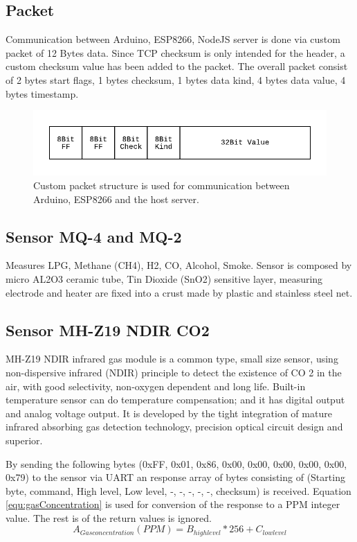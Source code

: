 \subsection{Packet}
Communication between Arduino, ESP8266, NodeJS server is done via custom packet of 12 Bytes data.
Since TCP checksum is only intended for the header, a custom checksum value has been added to the packet.
The overall packet consist of 2 bytes start flags, 1 bytes checksum, 1 bytes data kind, 4 bytes data value, 4 bytes timestamp.

\begin{figure}[p]
    \centering
    \includegraphics[width=\linewidth]{packet1}
    \caption{Custom packet structure is used for communication between Arduino, ESP8266 and the host server.}
    \label{fig:packet1}
\end{figure}


\subsection{Sensor MQ-4 and MQ-2}
Measures LPG, Methane (CH4), H2, CO, Alcohol, Smoke.
Sensor is composed by micro AL2O3 ceramic tube, Tin Dioxide (SnO2) sensitive layer,
measuring electrode and heater are fixed into a crust made by plastic and stainless steel net.


\subsection{Sensor MH-Z19 NDIR CO2}
MH-Z19 NDIR infrared gas module is a common type, small size sensor, using non-dispersive
infrared (NDIR) principle to detect the existence of CO 2 in the air, with good selectivity, non-oxygen
dependent and long life. Built-in temperature sensor can do temperature compensation; and it has
digital output and analog voltage output. It is developed by the tight integration of mature infrared absorbing
gas detection technology, precision optical circuit design and superior.

By sending the following bytes (0xFF, 0x01, 0x86, 0x00, 0x00, 0x00, 0x00, 0x00, 0x79) to the sensor via UART an response array of bytes consisting of
(Starting byte, command, High level, Low level, -, -, -, -, -, checksum) is received. Equation \ref{equ:gasConcentration} is used for conversion of the response to a PPM integer value.
The rest is of the return values is ignored.
\begin{equation}
  A_{Gas concentration} (PPM) = B_{high level} * 256 + C_{low level}
  \label{equ:gasConcentration}
\end{equation}


